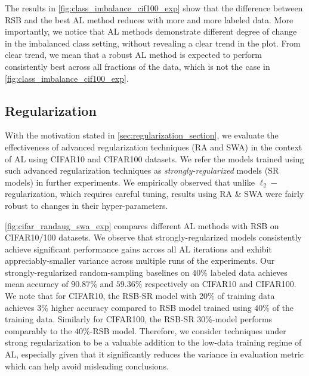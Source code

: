 \documentclass[10pt,twocolumn,letterpaper]{article}
\begin{document}
The results in \cref{fig:class_imbalance_cif100_exp} show that the difference between RSB and the best AL method reduces with more and more labeled data. More importantly, we notice that AL methods demonstrate different degree of change in the imbalanced class setting, without revealing a clear trend in the plot. From clear trend, we mean that a robust AL method is expected to perform consistently best across all fractions of the data, which is not the case in \cref{fig:class_imbalance_cif100_exp}.

\subsection{Regularization} \label{Regularization}
With the motivation stated in \cref{sec:regularization_section}, we evaluate the effectiveness of advanced regularization techniques (RA and SWA) in the context of AL using CIFAR10 and CIFAR100 datasets. We refer the models trained using such advanced regularization techniques as \textit{strongly-regularized} models (SR models) in further experiments.
We empirically observed that unlike $\ell_2-$regularization, which requires careful tuning, results using RA \& SWA were fairly robust to changes in their hyper-parameters.


\cref{fig:cifar_randaug_swa_exp} compares different AL methods with RSB on CIFAR10/100 datasets. We observe that strongly-regularized models consistently achieve significant performance gains across all AL iterations and exhibit appreciably-smaller variance across multiple runs of the experiments. Our strongly-regularized random-sampling baselines on $40\%$ labeled data achieves mean accuracy of $90.87\%$ and $59.36\%$ respectively on CIFAR10 and CIFAR100. We note that for CIFAR10, the RSB-SR model with 20\% of training data achieves $3\%$ higher accuracy compared to RSB model trained using $40\%$ of the training data. Similarly for CIFAR100, the RSB-SR $30\%$-model performs comparably to the $40\%$-RSB model. Therefore, we consider techniques under strong regularization to be a valuable addition to the low-data training regime of AL, especially given that it significantly reduces the variance in evaluation metric which can help avoid misleading conclusions.
\end{document}
